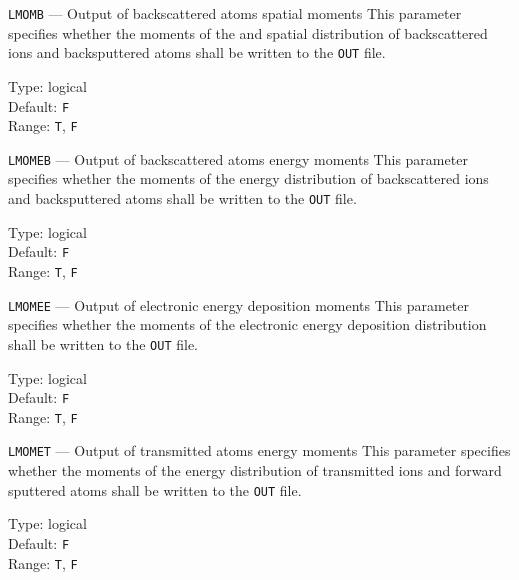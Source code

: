 \begin{keydescription}{\texttt{LMOMB} --- Output of backscattered atoms
spatial moments}
%
  This parameter specifies whether the moments of the and spatial distribution 
  of backscattered ions and backsputtered atoms shall be written to the \texttt{OUT} file.
  \begin{keytab}
    Type:    \> logical \\
    Default: \> \texttt{F} \\
    Range:   \> \texttt{T}, \texttt{F} 
  \end{keytab}
\end{keydescription}

\begin{keydescription}{\texttt{LMOMEB} --- Output of backscattered atoms
energy moments}
%
  This parameter specifies whether the moments of the energy distribution 
  of backscattered ions and backsputtered atoms shall be written to the
  \texttt{OUT} file. 
  \begin{keytab}
    Type:    \> logical \\
    Default: \> \texttt{F} \\
    Range:   \> \texttt{T}, \texttt{F} 
  \end{keytab}
\end{keydescription}

\begin{keydescription}{\texttt{LMOMEE} --- Output of electronic energy deposition moments}
%
  This parameter specifies whether the moments of the electronic energy
  deposition distribution shall be written to the \texttt{OUT} file.
  \begin{keytab}
    Type:    \> logical \\
    Default: \> \texttt{F} \\
    Range:   \> \texttt{T}, \texttt{F} 
  \end{keytab}
\end{keydescription}

\begin{keydescription}{\texttt{LMOMET} --- Output of transmitted atoms energy
moments}
%
  This parameter specifies whether the moments of the energy distribution 
  of transmitted ions and forward sputtered atoms shall be written to
  the \texttt{OUT} file. 
  \begin{keytab}
    Type:    \> logical \\
    Default: \> \texttt{F} \\
    Range:   \> \texttt{T}, \texttt{F} 
  \end{keytab}
\end{keydescription}

